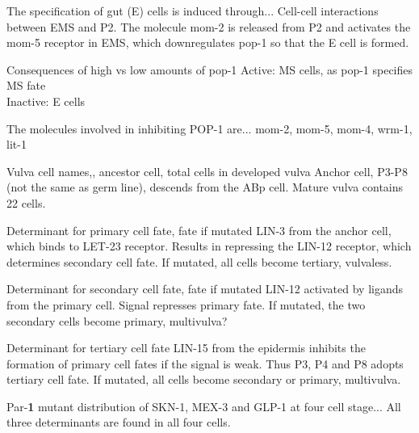 \begin{flashcard}{The specification of gut (E) cells is induced through...}
    Cell-cell interactions between EMS and P2.
    The molecule mom-2 is released from P2 and activates the mom-5 receptor in EMS, which downregulates pop-1 so that the E cell is formed.
\end{flashcard}

\begin{flashcard}{Consequences of high vs low amounts of pop-1}
    Active: MS cells, as pop-1 specifies MS fate \\
    Inactive: E cells
\end{flashcard}

\begin{flashcard}[Genes]{The molecules involved in inhibiting POP-1 are...}
    mom-2, mom-5, mom-4, wrm-1, lit-1
\end{flashcard}

\begin{flashcard}{Vulva cell names,, ancestor cell, total cells in developed vulva}
    Anchor cell, P3-P8 (not the same as germ line), descends from the ABp cell. Mature vulva contains 22 cells. 
\end{flashcard}

\begin{flashcard}{Determinant for primary cell fate, fate if mutated}
    LIN-3 from the anchor cell, which binds to LET-23 receptor. Results in repressing the LIN-12 receptor, which determines secondary cell fate. If mutated, all cells become tertiary, vulvaless.
\end{flashcard}

\begin{flashcard}{Determinant for secondary cell fate, fate if mutated}
    LIN-12 activated by ligands from the primary cell. Signal represses primary fate. If mutated, the two secondary cells become primary, multivulva?
\end{flashcard}

\begin{flashcard}{Determinant for tertiary cell fate}
    LIN-15 from the epidermis inhibits the formation of primary cell fates if the signal is weak. Thus P3, P4 and P8 adopts tertiary cell fate. If mutated, all cells become secondary or primary, multivulva.
\end{flashcard}

\begin{flashcard}{Par-\textbf{1} mutant distribution of SKN-1, MEX-3 and GLP-1 at four cell stage...}
    All three determinants are found in all four cells.
\end{flashcard}

